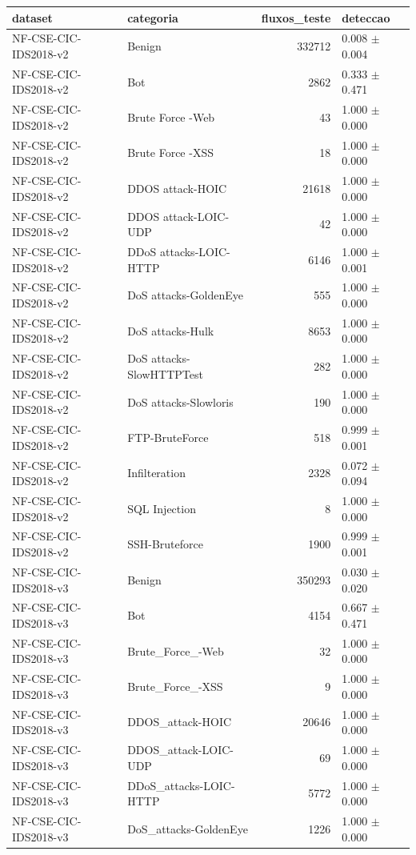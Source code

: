 \begin{tabular}{llrl}
\toprule
dataset & categoria & fluxos_teste & deteccao \\
\midrule
NF-CSE-CIC-IDS2018-v2 & Benign & 332712 & 0.008 $\pm$ 0.004 \\
NF-CSE-CIC-IDS2018-v2 & Bot & 2862 & 0.333 $\pm$ 0.471 \\
NF-CSE-CIC-IDS2018-v2 & Brute Force -Web & 43 & 1.000 $\pm$ 0.000 \\
NF-CSE-CIC-IDS2018-v2 & Brute Force -XSS & 18 & 1.000 $\pm$ 0.000 \\
NF-CSE-CIC-IDS2018-v2 & DDOS attack-HOIC & 21618 & 1.000 $\pm$ 0.000 \\
NF-CSE-CIC-IDS2018-v2 & DDOS attack-LOIC-UDP & 42 & 1.000 $\pm$ 0.000 \\
NF-CSE-CIC-IDS2018-v2 & DDoS attacks-LOIC-HTTP & 6146 & 1.000 $\pm$ 0.001 \\
NF-CSE-CIC-IDS2018-v2 & DoS attacks-GoldenEye & 555 & 1.000 $\pm$ 0.000 \\
NF-CSE-CIC-IDS2018-v2 & DoS attacks-Hulk & 8653 & 1.000 $\pm$ 0.000 \\
NF-CSE-CIC-IDS2018-v2 & DoS attacks-SlowHTTPTest & 282 & 1.000 $\pm$ 0.000 \\
NF-CSE-CIC-IDS2018-v2 & DoS attacks-Slowloris & 190 & 1.000 $\pm$ 0.000 \\
NF-CSE-CIC-IDS2018-v2 & FTP-BruteForce & 518 & 0.999 $\pm$ 0.001 \\
NF-CSE-CIC-IDS2018-v2 & Infilteration & 2328 & 0.072 $\pm$ 0.094 \\
NF-CSE-CIC-IDS2018-v2 & SQL Injection & 8 & 1.000 $\pm$ 0.000 \\
NF-CSE-CIC-IDS2018-v2 & SSH-Bruteforce & 1900 & 0.999 $\pm$ 0.001 \\
NF-CSE-CIC-IDS2018-v3 & Benign & 350293 & 0.030 $\pm$ 0.020 \\
NF-CSE-CIC-IDS2018-v3 & Bot & 4154 & 0.667 $\pm$ 0.471 \\
NF-CSE-CIC-IDS2018-v3 & Brute_Force_-Web & 32 & 1.000 $\pm$ 0.000 \\
NF-CSE-CIC-IDS2018-v3 & Brute_Force_-XSS & 9 & 1.000 $\pm$ 0.000 \\
NF-CSE-CIC-IDS2018-v3 & DDOS_attack-HOIC & 20646 & 1.000 $\pm$ 0.000 \\
NF-CSE-CIC-IDS2018-v3 & DDOS_attack-LOIC-UDP & 69 & 1.000 $\pm$ 0.000 \\
NF-CSE-CIC-IDS2018-v3 & DDoS_attacks-LOIC-HTTP & 5772 & 1.000 $\pm$ 0.000 \\
NF-CSE-CIC-IDS2018-v3 & DoS_attacks-GoldenEye & 1226 & 1.000 $\pm$ 0.000 \\

\end{tabular}
